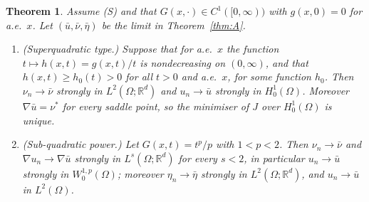 \documentclass[11pt]{amsart}
\newtheorem{maintheorem}{Theorem}
\theoremstyle{definition}
\theoremstyle{remark}
\numberwithin{equation}{section}
\newcommand{\R}{\mathbb{R}}
\begin{document}
\begin{maintheorem}\label{thm:B}
Assume (S) and that $G(x,\cdot)\in C^1([0,\infty))$ with $g(x,0)=0$ for a.e.\ $x$. Let $(\bar u,\bar\nu,\bar\eta)$ be the limit in Theorem~\ref{thm:A}.
\begin{enumerate}[label=\textup{(\alph*)}]
\item \textup{(Superquadratic type.)} Suppose that for a.e.\ $x$ the function $t\mapsto h(x,t)=g(x,t)/t$ is nondecreasing on $(0,\infty)$, and that $h(x,t)\ge h_0(t)>0$ for all $t>0$ and a.e.\ $x$, for some function $h_0$. Then $\nu_n\to\bar\nu$ strongly in $L^2(\Omega;\R^d)$ and $u_n\to\bar u$ strongly in $H^1_0(\Omega)$. Moreover $\nabla\bar u=\nu^*$ for every saddle point, so the minimiser of $J$ over $H^1_0(\Omega)$ is unique.
\item \textup{(Sub-quadratic power.)} Let $G(x,t)=t^p/p$ with $1<p<2$. Then $\nu_n\to\bar\nu$ and $\nabla u_n\to\nabla\bar u$ strongly in $L^s(\Omega;\R^d)$ for every $s<2$, in particular $u_n\to\bar u$ strongly in $W^{1,p}_0(\Omega)$; moreover $\eta_n\to\bar\eta$ strongly in $L^2(\Omega;\R^d)$, and $u_n\to\bar u$ in $L^2(\Omega)$.
\end{enumerate}
\end{maintheorem}
\end{document}
